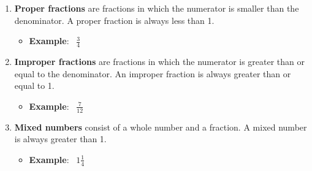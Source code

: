 \documentclass[handout, font=12pt]{ximera}
\begin{document}
\begin{problem}
\begin{center}
\begin{tikzpicture}[thick, scale=0.5]
\end{tikzpicture} 


\end{center}

\end{problem}

\begin{definition}

\begin{enumerate}
\item \textbf{Proper fractions} are fractions in which the numerator is smaller
than the denominator.  A proper fraction is always less than 1.

\begin{itemize}
        \item \textbf{Example}: \ $\frac{3}{4}$
\end{itemize}


\item \textbf{Improper fractions} are fractions in which the numerator is greater than
or equal to the denominator.  An improper fraction is always greater than or equal to 1.

\begin{itemize}
        \item \textbf{Example}: \ $\frac{7}{12}$
\end{itemize}


\item \textbf{Mixed numbers} consist of a whole number and a fraction.  A mixed number
is always greater than 1.

\begin{itemize}
        \item \textbf{Example}: \ $1 \frac{1}{4}$
\end{itemize}

\end{enumerate}

\end{definition}
\end{document}
